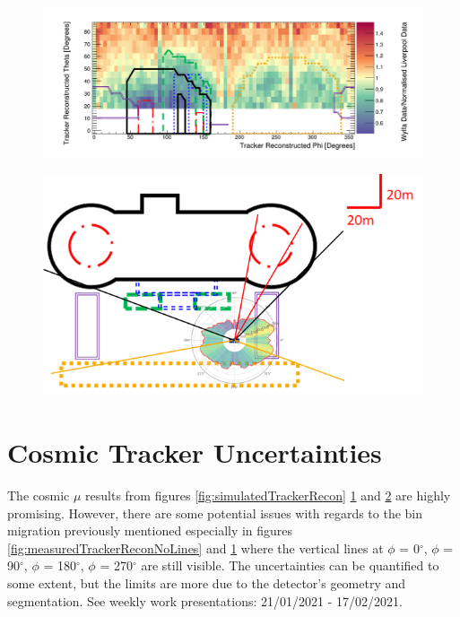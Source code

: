 \begin{figure}[htbp]
 \centering
 \includegraphics[width=\linewidth]{Chapter5/Figs/wylfaRasterNew/measuredTrackerRecon.png}
 \label{fig:measuredTrackerRecon}
\end{figure}

\begin{figure}[htbp]
 \centering
 \includegraphics[width=\linewidth]{Chapter5/Figs/wylfaRasterNew/wylfaCircular0-37.5Deg_Overlay_Updated.png}
 \label{fig:wylfaCircular0-37.5Deg_Overlay_Updated}
\end{figure}

\section{Cosmic Tracker Uncertainties}\label{sec:cosmicTrackerUncertainties}
The cosmic $\mu$ results from figures \ref{fig:simulatedTrackerRecon} \ref{fig:measuredTrackerRecon} and \ref{fig:wylfaCircular0-37.5Deg_Overlay_Updated} are highly promising. However, there are some potential issues with regards to the bin migration previously mentioned especially in figures \ref{fig:measuredTrackerReconNoLines} and \ref{fig:measuredTrackerRecon} where the vertical lines at $\phi$ = 0$^\circ$, $\phi$ = 90$^\circ$, $\phi$ = 180$^\circ$, $\phi$ = 270$^\circ$ are still visible. The uncertainties can be quantified to some extent, but the limits are more due to the detector's geometry and segmentation. See weekly work presentations: 21/01/2021 - 17/02/2021. 

